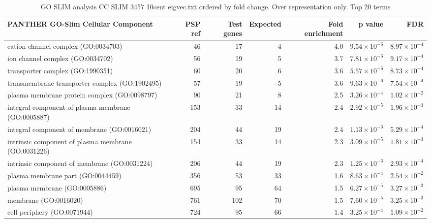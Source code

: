 \begin{table}[ht]
\centering
\begin{adjustbox}{width=\textwidth}

\begin{tabular}{lrrrrrr}
  \hline
PANTHER GO-Slim Cellular Component & PSP ref & Test genes & Expected & Fold enrichment & p value & FDR \\ 
  \hline
cation channel complex (GO:0034703) & 46 & 17 & 4 & 4.0 & $9.54 \times 10^{-6}$ & $8.97 \times 10^{-4}$ \\ 
  ion channel complex (GO:0034702) & 56 & 19 & 5 & 3.7 & $7.81 \times 10^{-6}$ & $9.17 \times 10^{-4}$ \\ 
  transporter complex (GO:1990351) & 60 & 20 & 6 & 3.6 & $5.57 \times 10^{-6}$ & $8.73 \times 10^{-4}$ \\ 
  transmembrane transporter complex (GO:1902495) & 57 & 19 & 5 & 3.6 & $9.63 \times 10^{-6}$ & $7.54 \times 10^{-4}$ \\ 
  plasma membrane protein complex (GO:0098797) & 90 & 21 & 8 & 2.5 & $3.26 \times 10^{-4}$ & $1.02 \times 10^{-2}$ \\ 
  integral component of plasma membrane (GO:0005887) & 153 & 33 & 14 & 2.4 & $2.92 \times 10^{-5}$ & $1.96 \times 10^{-3}$ \\ 
  integral component of membrane (GO:0016021) & 204 & 44 & 19 & 2.4 & $1.13 \times 10^{-6}$ & $5.29 \times 10^{-4}$ \\ 
  intrinsic component of plasma membrane (GO:0031226) & 154 & 33 & 14 & 2.3 & $3.09 \times 10^{-5}$ & $1.81 \times 10^{-3}$ \\ 
  intrinsic component of membrane (GO:0031224) & 206 & 44 & 19 & 2.3 & $1.25 \times 10^{-6}$ & $2.93 \times 10^{-4}$ \\ 
  plasma membrane part (GO:0044459) & 356 & 53 & 33 & 1.6 & $8.63 \times 10^{-4}$ & $2.54 \times 10^{-2}$ \\ 
  plasma membrane (GO:0005886) & 695 & 95 & 64 & 1.5 & $6.27 \times 10^{-5}$ & $3.27 \times 10^{-3}$ \\ 
  membrane (GO:0016020) & 761 & 102 & 70 & 1.5 & $7.60 \times 10^{-5}$ & $3.25 \times 10^{-3}$ \\ 
  cell periphery (GO:0071944) & 724 & 95 & 66 & 1.4 & $3.25 \times 10^{-4}$ & $1.09 \times 10^{-2}$ \\ 
   \hline
\end{tabular}
\end{adjustbox}
\caption{GO SLIM analysis CC SLIM 3457 10cent eigvec.txt ordered by fold change. Over representation only. Top 20 terms} 
\label{tab:GO SLIM analysis CC SLIM 3457 10cent eigvec.txt ordered by fold change. Over representation only. Top 20 terms}
\end{table}


